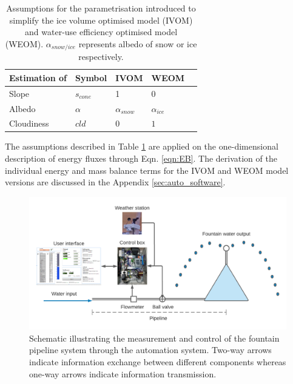 \begin{table}[htb]
	\centering
	\caption{Assumptions for the parametrisation introduced to simplify the ice volume optimised model (IVOM) and
		water-use efficiency optimised model (WEOM). $\alpha_{snow/ice}$ represents albedo of snow or ice respectively.}
	\label{tab:assumptions}
	\begin{tabular}{|lllll|}
		\toprule
		\textbf{Estimation of}          & \textbf{Symbol} & \textbf{IVOM}   & \textbf{WEOM}  &                       \\\midrule
		\multicolumn{1}{|l}{Slope}      & $s_{cone}$      & 1               & 0              & \multicolumn{1}{l|}{} \\
		\multicolumn{1}{|l}{Albedo}     & $\alpha$        & $\alpha_{snow}$ & $\alpha_{ice}$ & \multicolumn{1}{l|}{} \\
		\multicolumn{1}{|l}{Cloudiness} & $cld$           & $0$             & $1$            & \multicolumn{1}{l|}{} \\\bottomrule
	\end{tabular}
\end{table}

The assumptions described in Table \ref{tab:assumptions} are applied on the one-dimensional description of
energy fluxes through Eqn. \ref{eqn:EB}. The derivation of the individual energy and mass balance terms for the
\ac{IVOM} and \ac{WEOM} model versions are discussed in the Appendix \ref{sec:auto_software}.

\begin{figure}
\includegraphics[width=\linewidth]{figs/Automation_schematic.png}
\caption{Schematic illustrating the measurement and control of the fountain pipeline system through the
  automation system. Two-way arrows indicate information exchange between different components whereas one-way
  arrows indicate information transmission.}

\label{fig:auto_schematic} 
\end{figure}

